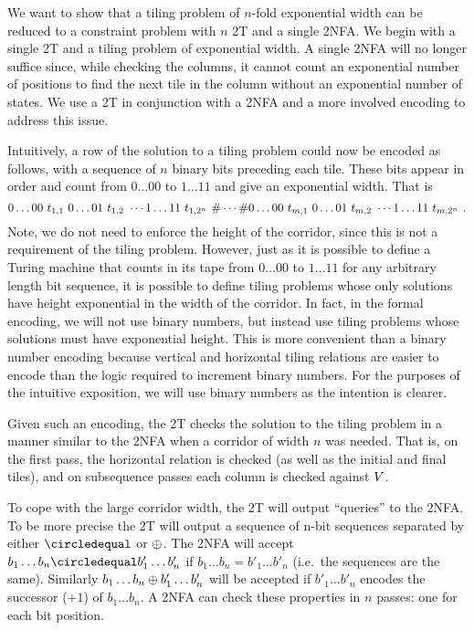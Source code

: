 We want to show that a tiling problem of $n$-fold exponential width can be reduced to a constraint problem with $n$ 2T and a single 2NFA.
We begin with a single 2T and a tiling problem of exponential width.
A single 2NFA will no longer suffice since, while checking the columns, it cannot count an exponential number of positions to find the next tile in the column without an exponential number of states.
We use a 2T in conjunction with a 2NFA and a more involved encoding to address this issue.

Intuitively, a row of the solution to a tiling problem could now be encoded as follows, with a sequence of $n$ binary bits preceding each tile.
These bits appear in order and count from $0\ldots00$ to $1\ldots11$ and give an exponential width.
That is
\[
    0\ldots00\ \tile_{1,1}\ %
    0\ldots01\ \tile_{1,2}\ %
    \cdots
    1\ldots11\ \tile_{1,2^n}\ %
    \numsep
    \cdots
    \numsep
    0\ldots00\ \tile_{m,1}\ %
    0\ldots01\ \tile_{m,2}\ %
    \cdots
    1\ldots11\ \tile_{m,2^n} \ .
\]
Note, we do not need to enforce the height of the corridor, since this is not a requirement of the tiling problem.
However, just as it is possible to define a Turing machine that counts in its tape from $0\ldots00$ to $1\ldots11$ for any arbitrary length bit sequence, it is possible to define tiling problems whose only solutions have height exponential in the width of the corridor.
In fact, in the formal encoding, we will not use binary numbers, but instead use tiling problems whose solutions must have exponential height.
This is more convenient than a binary number encoding because vertical and horizontal tiling relations are easier to encode than the logic required to increment binary numbers.
For the purposes of the intuitive exposition, we will use binary numbers as the intention is clearer.

Given such an encoding, the 2T checks the solution to the tiling problem in a manner similar to the 2NFA when a corridor of width $n$ was needed.
That is, on the first pass, the horizontal relation is checked (as well as the initial and final tiles), and on subsequence passes each column is checked against $V$.

To cope with the large corridor width, the 2T will output ``queries'' to the 2NFA.
To be more precise the 2T will output a sequence of n-bit sequences separated by either
$\numeq$ or $\oplus$.
The 2NFA will accept
$b_1 \ldots b_n \numeq b'_1 \ldots b'_n$
if
$b_1 \ldots b_n = b'_1 \ldots b'_n$
(i.e.~the sequences are the same).
Similarly
$b_1 \ldots b_n \oplus b'_1 \ldots b'_n$
will be accepted if 
$b'_1 \ldots b'_n$
encodes the successor ($+1$) of
$b_1 \ldots b_n$.
A 2NFA can check these properties in $n$ passes: one for each bit position.

